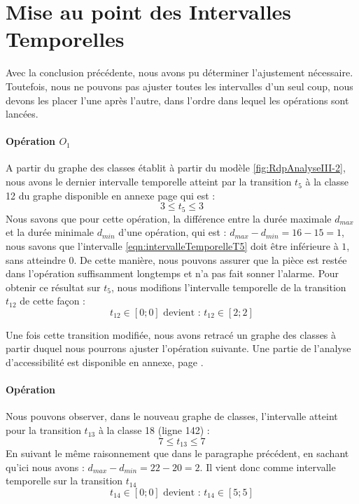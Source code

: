 
\section{Mise au point des Intervalles Temporelles}
Avec la conclusion précédente, nous avons pu déterminer l'ajustement nécessaire. Toutefois, nous ne pouvons pas ajuster toutes les intervalles d'un seul coup, nous devons les placer l'une après l'autre, dans l'ordre dans lequel les opérations sont lancées.

\paragraph*{Opération $O_1$}
A partir du graphe des classes établit à partir du modèle \ref{fig:RdpAnalyseIII-2}, nous avons le dernier intervalle temporelle atteint par la transition $t_5$ à la classe 12 du graphe disponible en annexe page \pageref{Annex:analyse} qui est :
\begin{equation}\label{eqn:intervalleTemporelleT5}
3 \leq t_5 \leq 3
\end{equation} 
Nous savons que pour cette opération, la différence entre la durée maximale $d_{max}$ et la durée minimale $d_{min}$ d'une opération, qui est : $d_{max} - d_{min} = 16-15 = 1$, nous savons que l'intervalle \ref{eqn:intervalleTemporelleT5} doit être inférieure à $1$, sans atteindre $0$. De cette manière, nous pouvons assurer que la pièce est restée dans l'opération suffisamment longtemps et n'a pas fait sonner l'alarme. Pour obtenir ce résultat sur $t_5$, nous modifions l'intervalle temporelle de la transition $t_{12}$ de cette façon : 
\begin{equation}
t_{12} \in [0;0] \text{ devient : }t_{12} \in [2;2] 
\end{equation}


Une fois cette transition modifiée, nous avons retracé un graphe des classes à partir duquel nous pourrons ajuster l'opération suivante. Une partie de l'analyse d'accessibilité est disponible en annexe, page \pageref{Annex:GDC-miseauPointI-Ope1}.

\paragraph*{Opération}
Nous pouvons observer, dans le nouveau graphe de classes, l'intervalle atteint pour la transition $t_{13}$ à la classe 18 (ligne 142) : 
\begin{equation}
7 \leq t_{13} \leq 7
\end{equation}
En suivant le même raisonnement que dans le paragraphe précédent, en sachant qu'ici nous avons :  $d_{max} - d_{min} = 22-20 = 2$. Il vient donc comme intervalle temporelle sur la transition $t_{14}$
\begin{equation}
t_{14} \in [0;0] \text{ devient : }t_{14} \in [5;5] 
\end{equation}

